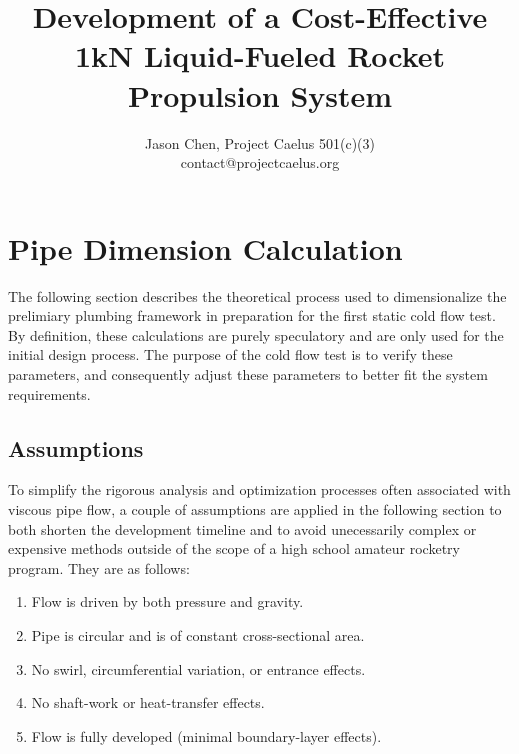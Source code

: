 \documentclass[11pt]{article} %
\title{Development of a Cost-Effective 1kN Liquid-Fueled Rocket Propulsion System}
\author{%
	Jason Chen, Project Caelus 501(c)(3)  \\
	\large contact@projectcaelus.org}
\numberwithin{equation}{section} %
\begin{document}
\maketitle

\section{Pipe Dimension Calculation}

The following section describes the theoretical process used to dimensionalize the prelimiary plumbing framework in preparation for the first static cold flow test. By definition, these calculations are purely speculatory and are only used for the initial design process. The purpose of the cold flow test is to verify these parameters, and consequently adjust these parameters to better fit the system requirements.

\subsection{Assumptions} \label{sec:assumptions}

To simplify the rigorous analysis and optimization processes often associated with viscous pipe flow, a couple of assumptions are applied in the following section to both shorten the development timeline and to avoid unecessarily complex or expensive methods outside of the scope of a high school amateur rocketry program. They are as follows:
\begin{enumerate}
\item Flow is driven by both pressure and gravity.
\item Pipe is circular and is of constant cross-sectional area. \label{itm:constant-area}
\item No swirl, circumferential variation, or entrance effects.
\item No shaft-work or heat-transfer effects. \label{itm:heat-effects}
\item Flow is fully developed (minimal boundary-layer effects).

\end{enumerate}
\end{document}
